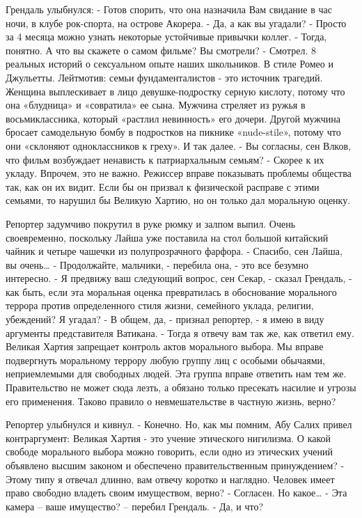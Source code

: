 \documentclass{book}
\begin{document}
Грендаль улыбнулся:
- Готов спорить, что она назначила Вам свидание в час ночи, в клубе рок-спорта, на острове Акорера.
- Да, а как вы угадали?
- Просто за 4 месяца можно узнать некоторые устойчивые привычки коллег.
- Тогда, понятно. А что вы скажете о самом фильме? Вы смотрели?
- Смотрел. 8 реальных историй о сексуальном опыте наших школьников. В стиле Ромео и Джульетты. Лейтмотив: семьи фундаменталистов - это источник трагедий. Женщина выплескивает в лицо девушке-подростку серную кислоту, потому что она «блудница» и «совратила» ее сына. Мужчина стреляет из ружья в восьмиклассника, который «растлил невинность» его дочери. Другой мужчина бросает самодельную бомбу в подростков на пикнике «nude-stile», потому что они «склоняют одноклассников к греху». И так далее.
- Вы согласны, сен Влков, что фильм возбуждает ненависть к патриархальным семьям?
- Скорее к их укладу. Впрочем, это не важно. Режиссер вправе показывать проблемы общества так, как он их видит. Если бы он призвал к физической расправе с этими семьями, то нарушил бы Великую Хартию, но он только дал моральную оценку.

Репортер задумчиво покрутил в руке рюмку и залпом выпил. Очень своевременно, поскольку Лайша уже поставила на стол большой китайский чайник и четыре чашечки из полупрозрачного фарфора.
- Спасибо, сен Лайша, вы очень\ldots{}
- Продолжайте, мальчики, - перебила она, - это все безумно интересно.
- Я предвижу ваш следующий вопрос, сен Секар, - сказал Грендаль, - как быть, если эта моральная оценка превратилась в обоснование морального террора против определенного стиля жизни, семейного уклада, религии, убеждений? Я угадал?
- В общем, да, - признал репортер, - я имею в виду аргументы представителя Ватикана.
- Тогда я отвечу вам так же, как ответил ему. Великая Хартия запрещает контроль актов морального выбора. Мы вправе подвергнуть моральному террору любую группу лиц с особыми обычаями, неприемлемыми для свободных людей. Эта группа вправе ответить нам тем же. Правительство не может сюда лезть, а обязано только пресекать насилие и угрозы его применения. Таково правило о невмешательстве в частную жизнь, верно?

Репортер улыбнулся и кивнул.
- Конечно. Но, как мы помним, Абу Салих привел контраргумент: Великая Хартия - это учение этического нигилизма. О какой свободе морального выбора можно говорить, если одно из этических учений объявлено высшим законом и обеспечено правительственным принуждением?
- Этому типу я отвечал длинно, вам отвечу коротко и наглядно. Человек имеет право свободно владеть своим имуществом, верно?
- Согласен. Но какое\ldots{}
- Эта камера – ваше имущество? – перебил Грендаль.
- Да, и что?
\end{document}
